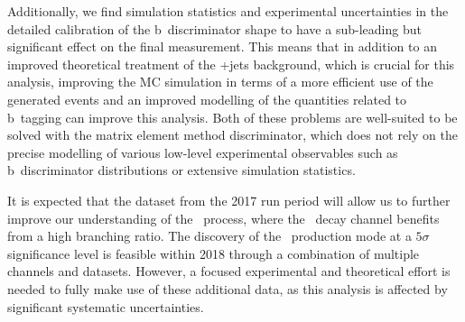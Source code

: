 Additionally, we find simulation statistics and experimental uncertainties in the detailed calibration of the b~discriminator shape to have a sub-leading but significant effect on the final measurement. This means that in addition to an improved theoretical treatment of the \ttbar+jets background, which is crucial for this analysis, improving the MC simulation in terms of a more efficient use of the generated events and an improved modelling of the quantities related to b~tagging can improve this analysis. Both of these problems are well-suited to be solved with the matrix element method discriminator, which does not rely on the precise modelling of various low-level experimental observables such as b~discriminator distributions or extensive simulation statistics.

It is expected that the dataset from the 2017 run period will allow us to further improve our understanding of the \ttH~process, where the \Hbb~decay channel benefits from a high branching ratio. The discovery of the \ttH~production mode at a $5\sigma$ significance level is feasible within 2018 through a combination of multiple channels and datasets. However, a focused experimental and theoretical effort is needed to fully make use of these additional data, as this analysis is affected by significant systematic uncertainties.
